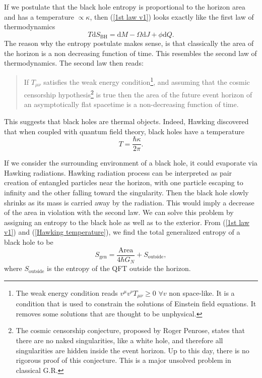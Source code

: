 If we postulate that the black hole entropy is proportional to the horizon area and has a temperature $\propto \kappa$, then (\ref{1st law v1}) looks exactly like the first law of thermodynamics
\begin{equation}\label{1st law v2}
    T\text{d}S_{\text{BH}} = \text{d}M -\Omega\text{d}J + \phi\text{d}Q.
\end{equation}
The reason why the entropy postulate makes sense, is that classically the area of the horizon is a non decreasing function of time. This resembles the second law of thermodynamics. The second law then reads\cite{Townsend:1997ku}: \begin{quote}
    If $T_{\mu\nu}$ satisfies the weak energy condition\footnote{The weak energy condition reads $v^\mu v^\nu T_{\mu\nu}\geq 0$ $\forall v$ non space-like. It is a condition that is used to constrain the solutions of Einstein field equations. It removes some solutions that are thought to be unphysical.}, and assuming that the cosmic censorship hypothesis\footnote{The cosmic censorship conjecture, proposed by Roger Penrose, states that there are no naked singularities, like a white hole, and therefore all singularities are hidden inside the event horizon. Up to this day, there is no rigorous proof of this conjecture. This is a major unsolved problem in classical G.R.} is true then the area of the future event horizon of an asymptotically flat spacetime is a non-decreasing function of time.
\end{quote}

This suggests that black holes are thermal objects. Indeed, Hawking discovered \cite{Hawking1975} that when coupled with quantum field theory, black holes have a temperature
\begin{equation}\label{Hawking temperature}
    T = \frac{\hbar \kappa}{2\pi}.
\end{equation}

If we consider the surrounding environment of a black hole, it could evaporate via Hawking radiations. Hawking radiation process can be interpreted as pair creation of entangled particles near the horizon, with one particle escaping to infinity and the other falling toward the singularity. Then the black hole slowly shrinks as its mass is carried away by the radiation. This would imply a decrease of the area in violation with the second law. We can solve this problem by assigning an entropy to the black hole as well as to the exterior. From (\ref{1st law v1}) and (\ref{Hawking temperature}), we find the total generalized entropy of a black hole to be
\begin{equation}\label{generalized entropy}
    S_{\text{gen}} = \frac{\text{Area}}{4\hbar G_N} + S_\text{outside},
\end{equation}
where $S_\text{outside}$ is the entropy of the QFT outside the horizon.

